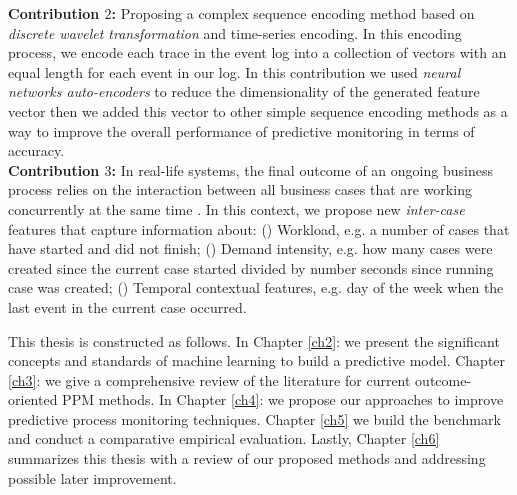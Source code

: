 \textbf{Contribution $2$:} Proposing a complex sequence encoding method based on \textit{discrete wavelet transformation} \cite{edwards1991discrete} and time-series encoding. In this encoding process, we encode each trace in the event log into a collection of vectors with an equal length for each event in our log. In this contribution we used \textit{neural networks auto-encoders} to reduce the dimensionality of the generated feature vector then we added this vector to other simple sequence encoding methods as a way to improve the overall performance of predictive monitoring in terms of accuracy.  \\

\textbf{Contribution $3$:} In real-life systems, the final outcome of an ongoing business process relies on the interaction between all business cases that are working concurrently at the same time \cite{senderovich2019knowledge}. In this context, we propose new \textit{inter-case} features that capture information about: () Workload, e.g. a number of cases that have started and did not finish; () Demand intensity, e.g. how many cases were created since the current case started divided by number seconds since running case was created; () Temporal contextual features, e.g. day of the week when the last event in the current case occurred.


This thesis is constructed as follows. In Chapter \ref{ch2}: we present the significant concepts and standards of machine learning to build a predictive model.  Chapter \ref{ch3}: we give a comprehensive review of the literature for current outcome-oriented PPM methods.  In Chapter \ref{ch4}: we propose our approaches to improve predictive process monitoring techniques. Chapter \ref{ch5} we build the benchmark and conduct a comparative empirical evaluation. Lastly, Chapter \ref{ch6} summarizes this thesis with a review of our proposed methods and addressing possible later improvement.














